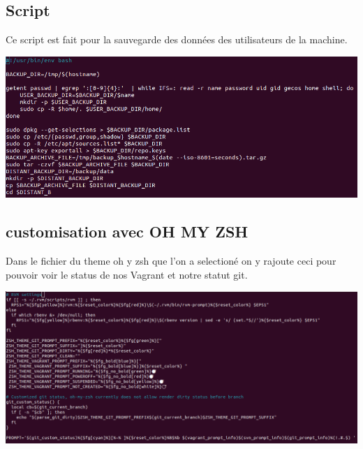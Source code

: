\documentclass{article}
\begin{document}
 \subsection{\large{Script}}
 Ce script est fait pour la sauvegarde des données des utilisateurs de la machine.
  \begin{center}
        \includegraphics[scale=0.5]{Images/save.png}
    \end{center}
    
 \newpage
 \subsection{\large{customisation avec OH MY ZSH}}
 Dans le fichier du theme oh y zsh que l'on a selectioné on y rajoute ceci pour pouvoir voir le status de nos Vagrant et notre statut git.
 
 \begin{center}
        \includegraphics[scale=0.43]{Images/theme.png}
    \end{center}
    
 
\end{document}
